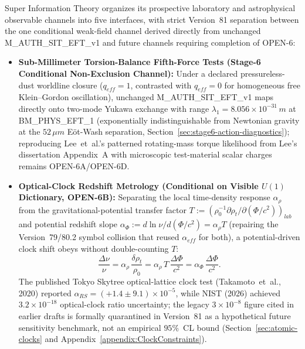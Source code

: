 \documentclass[american,11pt,letterpaper]{article}
\def\mathcal#1{#1}%
\def\mathrm#1{#1}%
\def\texttt#1{#1}%
\def\emph#1{#1}%
\begin{document}
Super Information Theory organizes its prospective laboratory and astrophysical observable channels into five interfaces, with strict Version~81 separation between the one conditional weak-field channel derived directly from unchanged \texttt{M\_AUTH\_SIT\_EFT\_v1} and future channels requiring completion of \texttt{OPEN-6}:
\begin{itemize}
  \item \textbf{Sub-Millimeter Torsion-Balance Fifth-Force Tests (Stage-6 Conditional Non-Exclusion Channel):} Under a declared pressureless-dust worldline closure ($q_{\mathrm{eff}} = 1$, contrasted with $q_{\mathrm{eff}} = 0$ for homogeneous free Klein--Gordon oscillation), unchanged \texttt{M\_AUTH\_SIT\_EFT\_v1} maps directly onto two-mode Yukawa exchange with range $\lambda_1 = 8.056\times 10^{-31}\,\mathrm{m}$ at \texttt{BM\_PHYS\_EFT\_1} (exponentially indistinguishable from Newtonian gravity at the $52\,\mu\mathrm{m}$ E\"ot-Wash separation, Section~\ref{sec:stage6-action-diagnostics}); reproducing Lee~\emph{et~al.}'s patterned rotating-mass torque likelihood from Lee's dissertation Appendix~A with microscopic test-material scalar charges remains \texttt{OPEN-6A}/\texttt{OPEN-6D}.
  \item \textbf{Optical-Clock Redshift Metrology (Conditional on Visible $U(1)$ Dictionary, \texttt{OPEN-6B}):} Separating the local time-density response $\alpha_\rho$ from the gravitational-potential transfer factor $\mathcal{T} := (\rho_0^{-1}\partial\rho_t/\partial(\Phi/c^2))_{\mathrm{lab}}$ and potential redshift slope $\alpha_\Phi := d\ln\nu/d(\Phi/c^2) = \alpha_\rho\mathcal{T}$ (repairing the Version~79/80.2 symbol collision that reused $\alpha_{\mathrm{eff}}$ for both), a potential-driven clock shift obeys without double-counting $\mathcal{T}$:
  \begin{equation}
  \frac{\Delta\nu}{\nu} = \alpha_\rho\,\frac{\delta\rho_t}{\rho_0} = \alpha_\rho\,\mathcal{T}\,\frac{\Delta\Phi}{c^2} = \alpha_\Phi\,\frac{\Delta\Phi}{c^2}.
  \label{eq:clock_shift_map_sec7}
  \end{equation}
  The published Tokyo Skytree optical-lattice clock test (Takamoto~\emph{et~al.}, 2020) reported $\alpha_{\mathrm{RS}} = (+1.4 \pm 9.1)\times 10^{-5}$, while NIST (2026) achieved $3.2\times 10^{-18}$ optical-clock ratio uncertainty; the legacy $3\times 10^{-8}$ figure cited in earlier drafts is formally quarantined in Version~81 as a \emph{hypothetical future sensitivity benchmark}, not an empirical $95\%$~CL bound (Section~\ref{sec:atomic-clocks} and Appendix~\ref{appendix:ClockConstraints}).

\end{itemize}
\end{document}
